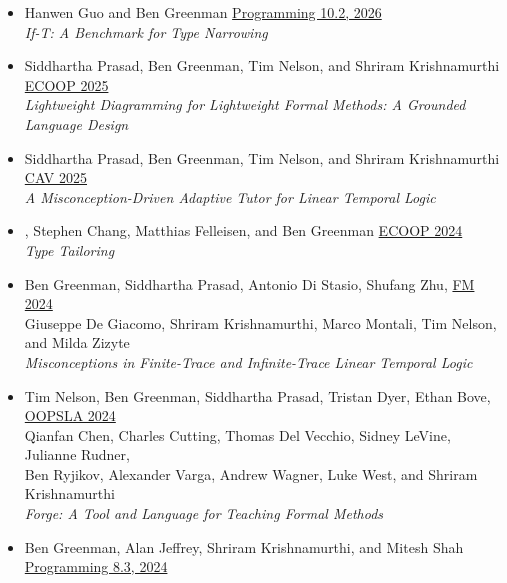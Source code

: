 \documentclass[11pt]{article}
\begin{document}
\begin{itemize}
\item
  Hanwen Guo and Ben Greenman \hfill \href{}{Programming 10.2, 2026} \\
    \emph{If-T: A Benchmark for Type Narrowing} \hfill {}
\item
  Siddhartha Prasad, Ben Greenman, Tim Nelson, and Shriram Krishnamurthi \hfill \href{https://2025.ecoop.org/}{ECOOP 2025} \\
    \emph{Lightweight Diagramming for Lightweight Formal Methods: A Grounded Language Design} \hfill {}
\item
  Siddhartha Prasad, Ben Greenman, Tim Nelson, and Shriram Krishnamurthi \hfill \href{https://conferences.i-cav.org/2025/}{CAV 2025} \\
    \emph{A Misconception-Driven Adaptive Tutor for Linear Temporal Logic} \hfill {}
\item
  , Stephen Chang, Matthias Felleisen, and Ben Greenman \hfill \href{https://2024.ecoop.org/}{ECOOP 2024} \\
    \emph{Type Tailoring} \hfill {}
\item
  Ben Greenman, Siddhartha Prasad, Antonio Di Stasio, Shufang Zhu, \hfill \href{https://www.fm24.polimi.it/}{FM 2024} \\
  Giuseppe De Giacomo, Shriram Krishnamurthi, Marco Montali, Tim Nelson, and Milda Zizyte \\
    \emph{Misconceptions in Finite-Trace and Infinite-Trace Linear Temporal Logic} \hfill {}
\item
  {Tim Nelson}, {Ben Greenman}, {Siddhartha Prasad}, {Tristan Dyer}, {Ethan Bove},
    \hfill \href{https://2024.splashcon.org/track/splash-2024-oopsla}{OOPSLA 2024} \\
  {Qianfan Chen}, {Charles Cutting}, {Thomas Del Vecchio}, {Sidney LeVine}, {Julianne Rudner}, \\
  {Ben Ryjikov}, {Alexander Varga}, {Andrew Wagner}, {Luke West}, and {Shriram Krishnamurthi} \\
    \emph{Forge: A Tool and Language for Teaching Formal Methods} \hfill {} %
\item
  Ben Greenman, Alan Jeffrey, Shriram Krishnamurthi, and Mitesh Shah \hfill \href{https://2024.programming-conference.org/}{Programming 8.3, 2024} \\

\end{itemize}
\end{document}
